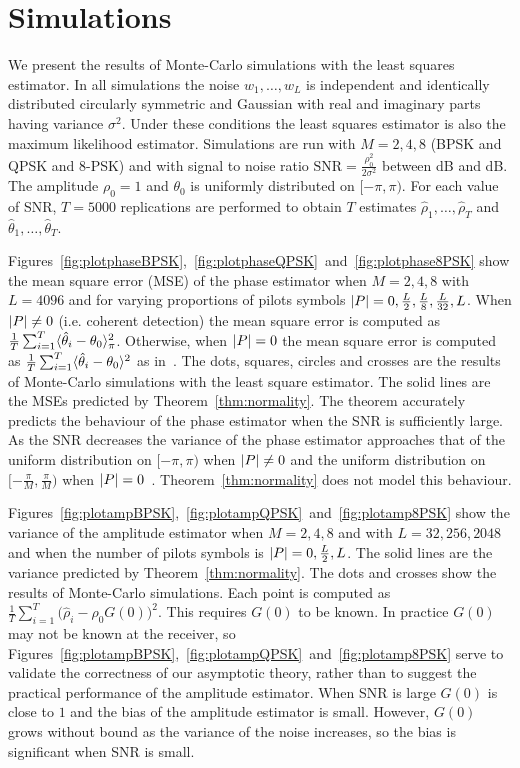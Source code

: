 \documentclass[journal]{IEEEtran}
\begin{document}
\section{Simulations}\label{sec:simulations}

We present the results of Monte-Carlo simulations with the least squares estimator.  In all simulations the noise $w_1,\dots,w_L$ is independent and identically distributed circularly symmetric and Gaussian with real and imaginary parts having variance $\sigma^2$.  Under these conditions the least squares estimator is also the maximum likelihood estimator.  Simulations are run with $M=2,4,8$ (BPSK and QPSK and $8$-PSK) and with signal to noise ratio $\text{SNR} = \tfrac{\rho_0^2}{2\sigma^2}$ between \unit[-20]{dB} and \unit[20]{dB}.  The amplitude $\rho_0=1$ and $\theta_0$ is uniformly distributed on $[-\pi, \pi)$.  For each value of SNR, $T = 5000$ replications are performed to obtain $T$ estimates $\hat{\rho}_1, \dots, \hat{\rho}_T$ and $\hat{\theta}_1, \dots, \hat{\theta}_T$.  

Figures~\ref{fig:plotphaseBPSK},~\ref{fig:plotphaseQPSK}~and~\ref{fig:plotphase8PSK} show the mean square error (MSE) of the phase estimator when $M=2,4,8$ with $L=4096$ and for varying proportions of pilots symbols ${\left\vert P \right\vert} = 0, \tfrac{L}{2}, \tfrac{L}{8}, \tfrac{L}{32}, L$.  When ${\left\vert P \right\vert} \neq 0$ (i.e. coherent detection) the mean square error is computed as $\tfrac{1}{T}\sum_{i=1}^T\langle \hat{\theta}_i - \theta_0 \rangle_\pi^2$.  Otherwise, when ${\left\vert P \right\vert}=0$ the mean square error is computed as $\tfrac{1}{T}\sum_{i=1}^T\langle \hat{\theta}_i - \theta_0 \rangle^2$ as in~\cite{McKilliam_leastsqPSKnoncoICASSP_2012}.  The dots, squares, circles and crosses are the results of Monte-Carlo simulations with the least square estimator.  The solid lines are the MSEs predicted by Theorem~\ref{thm:normality}.  The theorem accurately predicts the behaviour of the phase estimator when the SNR is sufficiently large.  As the SNR decreases the variance of the phase estimator approaches that of the uniform distribution on $[-\pi, \pi)$ when ${\left\vert P \right\vert} \neq 0$ and the uniform distribution on $[-\tfrac{\pi}{M}, \tfrac{\pi}{M})$ when ${\left\vert P \right\vert}=0$~\cite{McKilliam_leastsqPSKnoncoICASSP_2012}.  Theorem~\ref{thm:normality} does not model this behaviour.

Figures~\ref{fig:plotampBPSK},~\ref{fig:plotampQPSK}~and~\ref{fig:plotamp8PSK} show the variance of the amplitude estimator when $M=2,4,8$ and with $L=32, 256, 2048$ and when the number of pilots symbols is ${\left\vert P \right\vert} = 0, \tfrac{L}{2}, L$.  The solid lines are the variance predicted by Theorem~\ref{thm:normality}.  The dots and crosses show the results of Monte-Carlo simulations.  Each point is computed as $\tfrac{1}{T}\sum_{i=1}^T\big(\hat{\rho}_i - \rho_0G(0)\big)^2$.  This requires $G(0)$ to be known.  In practice $G(0)$ may not be known at the receiver, so Figures~\ref{fig:plotampBPSK},~\ref{fig:plotampQPSK}~and~\ref{fig:plotamp8PSK} serve to validate the correctness of our asymptotic theory, rather than to suggest the practical performance of the amplitude estimator.  When SNR is large $G(0)$ is close to $1$ and the bias of the amplitude estimator is small.  However, $G(0)$ grows without bound as the variance of the noise increases, so the bias is significant when SNR is small.
\end{document}
